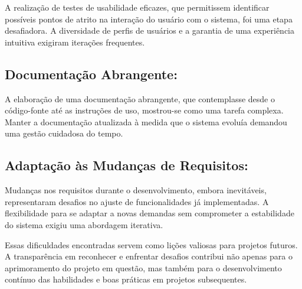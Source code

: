 \documentclass[12pt]{article}
\begin{document}
A realização de testes de usabilidade eficazes, que permitissem identificar possíveis pontos de atrito na interação do usuário com o sistema, foi uma etapa desafiadora. A diversidade de perfis de usuários e a garantia de uma experiência intuitiva exigiram iterações frequentes.

\subsection{Documentação Abrangente:}

A elaboração de uma documentação abrangente, que contemplasse desde o código-fonte até as instruções de uso, mostrou-se como uma tarefa complexa. Manter a documentação atualizada à medida que o sistema evoluía demandou uma gestão cuidadosa do tempo.

\subsection{Adaptação às Mudanças de Requisitos:}

Mudanças nos requisitos durante o desenvolvimento, embora inevitáveis, representaram desafios no ajuste de funcionalidades já implementadas. A flexibilidade para se adaptar a novas demandas sem comprometer a estabilidade do sistema exigiu uma abordagem iterativa.

Essas dificuldades encontradas servem como lições valiosas para projetos futuros. A transparência em reconhecer e enfrentar desafios contribui não apenas para o aprimoramento do projeto em questão, mas também para o desenvolvimento contínuo das habilidades e boas práticas em projetos subsequentes.
\end{document}

